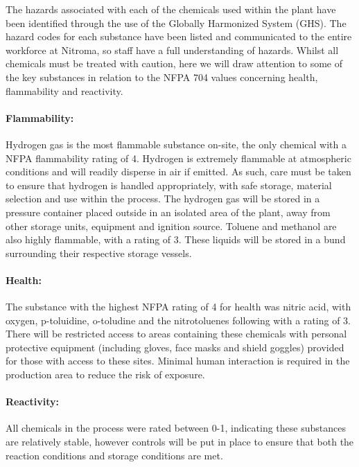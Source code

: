 The hazards associated with each of the chemicals used within the plant have been identified through the use of the Globally Harmonized System (GHS). The hazard codes for each substance have been listed and communicated to the entire workforce at Nitroma, so staff have a full understanding of hazards. Whilst all chemicals must be treated with caution, here we will draw attention to some of the key substances in relation to the NFPA 704 values concerning health, flammability and reactivity. 

\paragraph{Flammability:}

Hydrogen gas is the most flammable substance on-site, the only chemical with a NFPA flammability rating of 4.  Hydrogen is extremely flammable at atmospheric conditions and will readily disperse in air if emitted. As such, care must be taken to ensure that hydrogen is handled appropriately, with safe storage, material selection and use within the process. The hydrogen gas will be stored in a pressure container placed outside in an isolated area of the plant, away from other storage units, equipment and ignition source.  Toluene and methanol are also highly flammable, with a rating of 3. These liquids will be stored in a bund surrounding their respective storage vessels. 


\paragraph{Health:}

The substance with the highest NFPA rating of 4 for health was nitric acid, with oxygen, p-toluidine, o-toludine and the nitrotoluenes  following with a rating of 3. There will be restricted access to areas containing these chemicals with personal protective equipment (including gloves, face masks and shield goggles) provided for those with access to these sites. Minimal human interaction is required in the production area to reduce the risk of exposure.

\paragraph{Reactivity:}

All chemicals in the process were rated between 0-1, indicating these substances are relatively stable, however controls will be put in place to ensure that both the reaction conditions and storage conditions are met. 

